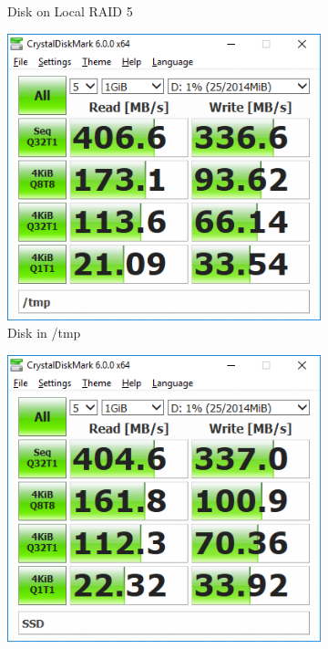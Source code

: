 \documentclass[12pt]{article}
\begin{document}
\begin{figure}[!ht]
\begin{subfigure}[t]{0.45\textwidth}
		\caption{Disk on Local RAID 5}
	\end{subfigure}
	\begin{subfigure}[t]{0.45\textwidth}
		\includegraphics[width=\textwidth]{tmp.png}
		\caption{Disk in /tmp}
	\end{subfigure}
	\begin{subfigure}[t]{0.45\textwidth}
		\includegraphics[width=\textwidth]{ssd.png}

\end{subfigure}
\end{figure}
\end{document}
